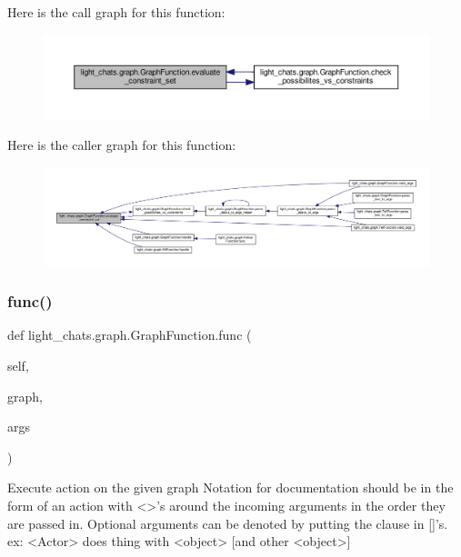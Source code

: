 Here is the call graph for this function\+:
\nopagebreak
\begin{figure}[H]
\begin{center}
\leavevmode
\includegraphics[width=350pt]{classlight__chats_1_1graph_1_1GraphFunction_a2110ae09489d9ebc9291a1fd39d8c4cd_cgraph}
\end{center}
\end{figure}
Here is the caller graph for this function\+:
\nopagebreak
\begin{figure}[H]
\begin{center}
\leavevmode
\includegraphics[width=350pt]{classlight__chats_1_1graph_1_1GraphFunction_a2110ae09489d9ebc9291a1fd39d8c4cd_icgraph}
\end{center}
\end{figure}
\mbox{\label{classlight__chats_1_1graph_1_1GraphFunction_a9fd67b8cadf1f9be60d4885d21287518}} 
\subsubsection{\texorpdfstring{func()}{func()}}
{\footnotesize\ttfamily def light\+\_\+chats.\+graph.\+Graph\+Function.\+func (\begin{DoxyParamCaption}\item[{}]{self,  }\item[{}]{graph,  }\item[{}]{args }\end{DoxyParamCaption})}

\begin{DoxyVerb}Execute action on the given graph
Notation for documentation should be in the form of an action with <>'s
around the incoming arguments in the order they are passed in. Optional
arguments can be denoted by putting the clause in []'s.
ex:
<Actor> does thing with <object> [and other <object>]
\end{DoxyVerb}
 

